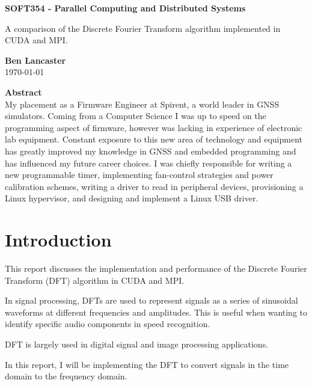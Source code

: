 \documentclass[11pt,a4paper]{article}
\begin{document}
\begin{titlepage}
\begin{center}

\vspace*{3cm}
\Large
\textbf{SOFT354 - Parallel Computing and Distributed Systems}

\vspace{0.4cm}
\large
A comparison of the Discrete Fourier Transform algorithm implemented in CUDA and MPI.

\vspace{4cm}
\textbf{Ben Lancaster}\\
\today

\vspace{4cm}
\textbf{Abstract}\\
\small
My placement as a Firmware Engineer at Spirent, a world leader in GNSS simulators. Coming from a Computer Science I was up to speed on the programming aspect of firmware, however was lacking in experience of electronic lab equipment. Constant exposure to this new area of technology and equipment has greatly improved my knowledge in GNSS and embedded programming and has influenced my future career choices. I was chiefly responsible for writing a new programmable timer, implementing fan-control strategies and power calibration schemes, writing a driver to read in peripheral devices, provisioning a Linux hypervisor, and designing and implement a Linux USB driver.

\end{center}

\end{titlepage}

\renewcommand*\contentsname{Table of Contents}
\tableofcontents
\newpage

\section{Introduction}
This report discusses the implementation and performance of the Discrete Fourier Transform (DFT) algorithm in CUDA and MPI.

In signal processing, DFTs are used to represent signals as a series of sinusoidal waveforms at different frequencies and amplitudes. This is useful when wanting to identify specific audio components in speed recognition. 

DFT is largely used in digital signal and image processing applications. 

In this report, I will be implementing the DFT to convert signals in the time domain to the frequency domain.
\end{document}
